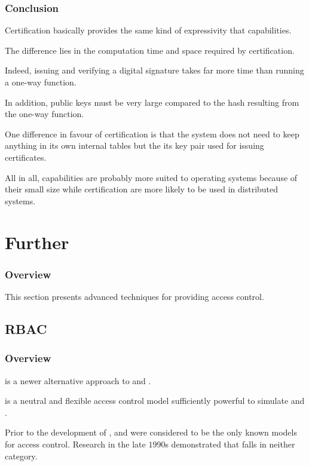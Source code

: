 
\begin{frame}
  \frametitle{Conclusion}

  Certification basically provides the same kind of expressivity that
  capabilities.

  \-

  The difference lies in the computation time and space required by
  certification.

  \-

  Indeed, issuing and verifying a digital signature takes far more time
  than running a one-way function.

  \-

  In addition, public keys must be very large compared to the hash resulting
  from the one-way function.

  \-

  One difference in favour of certification is that the system does not
  need to keep anything in its own internal tables but the its key pair used
  for issuing certificates.

  \-

  All in all, capabilities are probably more suited to operating systems
  because of their small size while certification are more likely to be used
  in distributed systems.
\end{frame}

%
%

\section{Further}


\begin{frame}
  \frametitle{Overview}

  This section presents advanced techniques for providing access control.
\end{frame}


\subsection{RBAC}


\begin{frame}
  \frametitle{Overview}

   is a newer alternative
  approach to  and .

  \-

   is a neutral and flexible access control model sufficiently
  powerful to simulate  and .

  \-

  Prior to the development of ,  and  were
  considered to be the only known models for access control. Research in the
  late $1990$s demonstrated that  falls in neither category.
\end{frame}

